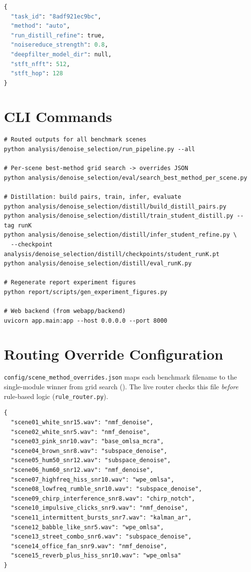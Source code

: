 \begin{lstlisting}[language=Python,caption={Example \texttt{POST /api/process} body.},label={lst:process_req}]
{
  "task_id": "8adf921ec9bc",
  "method": "auto",
  "run_distill_refine": true,
  "noisereduce_strength": 0.8,
  "deepfilter_model_dir": null,
  "stft_nfft": 512,
  "stft_hop": 128
}
\end{lstlisting}

\section{CLI Commands}
\label{app:cli}

\begin{lstlisting}[caption={Batch pipeline and evaluation (repository root).},label={lst:cli}]
# Routed outputs for all benchmark scenes
python analysis/denoise_selection/run_pipeline.py --all

# Per-scene best-method grid search -> overrides JSON
python analysis/denoise_selection/eval/search_best_method_per_scene.py

# Distillation: build pairs, train, infer, evaluate
python analysis/denoise_selection/distill/build_distill_pairs.py
python analysis/denoise_selection/distill/train_student_distill.py --tag runK
python analysis/denoise_selection/distill/infer_student_refine.py \
  --checkpoint analysis/denoise_selection/distill/checkpoints/student_runK.pt
python analysis/denoise_selection/distill/eval_runK.py

# Regenerate report experiment figures
python report/scripts/gen_experiment_figures.py

# Web backend (from webapp/backend)
uvicorn app.main:app --host 0.0.0.0 --port 8000
\end{lstlisting}

\section{Routing Override Configuration}
\label{app:overrides}

\texttt{config/scene\_method\_overrides.json} maps each benchmark filename to the single-module winner from grid search (). The live router checks this file \emph{before} rule-based logic (\texttt{rule\_router.py}).

\begin{lstlisting}[caption={Production override map (complete, 15 scenes).},label={lst:override}]
{
  "scene01_white_snr15.wav": "nmf_denoise",
  "scene02_white_snr5.wav": "nmf_denoise",
  "scene03_pink_snr10.wav": "base_omlsa_mcra",
  "scene04_brown_snr8.wav": "subspace_denoise",
  "scene05_hum50_snr12.wav": "subspace_denoise",
  "scene06_hum60_snr12.wav": "nmf_denoise",
  "scene07_highfreq_hiss_snr10.wav": "wpe_omlsa",
  "scene08_lowfreq_rumble_snr10.wav": "subspace_denoise",
  "scene09_chirp_interference_snr8.wav": "chirp_notch",
  "scene10_impulsive_clicks_snr9.wav": "nmf_denoise",
  "scene11_intermittent_bursts_snr7.wav": "kalman_ar",
  "scene12_babble_like_snr5.wav": "wpe_omlsa",
  "scene13_street_combo_snr6.wav": "subspace_denoise",
  "scene14_office_fan_snr9.wav": "nmf_denoise",
  "scene15_reverb_plus_hiss_snr10.wav": "wpe_omlsa"
}
\end{lstlisting}

